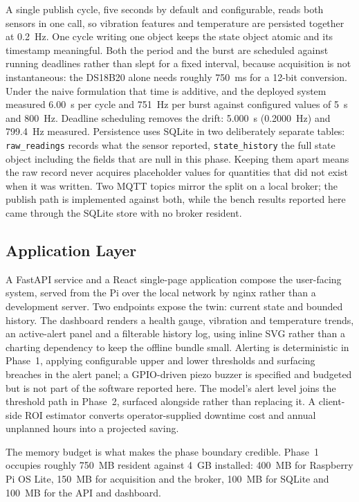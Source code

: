 \documentclass[conference]{IEEEtran}
\begin{document}
A single publish cycle, five seconds by default and configurable, reads both
sensors in one call, so vibration features and temperature are persisted
together at 0.2~Hz. One cycle writing one object keeps the state object
atomic and its timestamp meaningful. Both the period and the burst are
scheduled against running deadlines rather than slept for a fixed interval,
because acquisition is not instantaneous: the DS18B20 alone needs roughly
750~ms for a 12-bit conversion. Under the naive formulation that time is
additive, and the deployed system measured 6.00~s per cycle and 751~Hz per
burst against configured values of 5~s and 800~Hz. Deadline scheduling
removes the drift: 5.000~s (0.2000~Hz) and 799.4~Hz measured. Persistence
uses SQLite in two deliberately separate tables: \texttt{raw\_readings}
records what the sensor reported, \texttt{state\_history} the full state
object including the fields that are null in this phase. Keeping them apart
means the raw record never acquires placeholder values for quantities that
did not exist when it was written. Two MQTT topics mirror the split on a
local broker; the publish path is implemented against both, while the bench
results reported here came through the SQLite store with no broker
resident.

\subsection{Application Layer}

A FastAPI service and a React single-page application compose the
user-facing system, served from the Pi over the local network by nginx
rather than a development server. Two endpoints expose the twin: current
state and bounded history. The dashboard renders a health gauge, vibration
and temperature trends, an active-alert panel and a filterable history log,
using inline SVG rather than a charting dependency to keep the offline
bundle small. Alerting is deterministic in Phase~1, applying configurable
upper and lower thresholds and surfacing breaches in the alert panel; a
GPIO-driven piezo buzzer is specified and budgeted but is not part of the
software reported here. The model's alert level joins the threshold path in
Phase~2, surfaced alongside rather than replacing it. A client-side ROI
estimator converts operator-supplied downtime cost and annual unplanned
hours into a projected saving.

The memory budget is what makes the phase boundary credible. Phase~1
occupies roughly 750~MB resident against 4~GB installed: 400~MB for Raspberry
Pi OS Lite, 150~MB for acquisition and the broker, 100~MB for SQLite and
100~MB for the API and dashboard.
\end{document}
